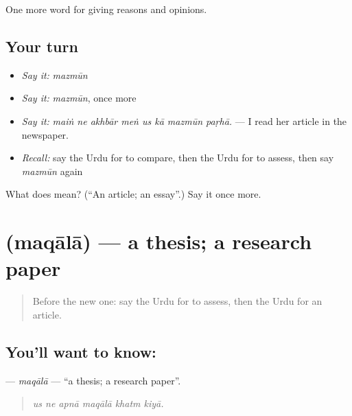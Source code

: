 \begin{grammarlens}[title={What you've built}]
One more word for giving reasons and opinions.
\end{grammarlens}

\subsection*{Your turn}
\begin{itemize}
\raggedright
  \item \emph{Say it:} \emph{mazmūn}
  \item \emph{Say it:} \emph{mazmūn}, once more
  \item \emph{Say it:} \emph{maiṅ ne akhbār meṅ us kā mazmūn paṛhā.} — I read her article in the newspaper.
  \item \emph{Recall:} say the Urdu for to compare, then the Urdu for to assess, then say \emph{mazmūn} again
\end{itemize}

\begin{tcolorbox}[breakable,colback=teal!4,colframe=teal!35!black,title={Before you move on}]
What does  mean? (\textquotedblleft{}An article; an essay\textquotedblright{}.) Say it once more.
\end{tcolorbox}
\section[\texorpdfstring{\ur{مقالہ} (maqālā)}{مقالہ (maqālā)}]{ (maqālā) — a thesis; a research paper}

\label{lesson:UR-C352-maqala}



\begin{quote}
Before the new one: say the Urdu for to assess, then the Urdu for an article.
\end{quote}

\subsection*{You'll want to know: }
\textbf{} — \emph{maqālā} — \textquotedblleft{}a thesis; a research paper\textquotedblright{}.

\begin{quote}
     
\end{quote}

\begin{quote}
\emph{us ne apnā maqālā khatm kiyā.}
\end{quote}

